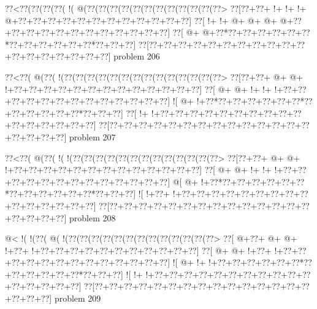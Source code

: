 \vbox{\vbox{\goo
\0??<\0??(\0??(\0??(\0??(\- !(\- @(\0??(\0??(\0??(\0??(\0??(\0??(\0??(\0??(\0??(\0??(\0??(\0??>
\0??[\0??+\0??+\- !+\- !+\- !+\- @+\0??+\0??+\0??+\0??+\0??+\0??+\0??+\0??+\0??+\0??+\0??+\0??]
\0??[\- !+\- !+\- @+\- @+\- @+\- @+\0??+\0??+\0??+\0??+\0??+\0??+\0??+\0??+\0??+\0??+\0??+\0??]
\0??[\- @+\- @+\0??*\0??+\0??+\0??+\0??+\0??+\0??*\0??+\0??+\0??+\0??+\0??+\0??*\0??+\0??+\0??]
\0??[\0??+\0??+\0??+\0??+\0??+\0??+\0??+\0??+\0??+\0??+\0??+\0??+\0??+\0??+\0??+\0??+\0??+\0??]
}
\hfil problem 206\hfil\break
}



\vbox{\vbox{\goo
\0??<\0??(\- @(\0??(\- !(\0??(\0??(\0??(\0??(\0??(\0??(\0??(\0??(\0??(\0??(\0??(\0??(\0??(\0??>
\0??[\0??+\0??+\- @+\- @+\- !+\0??+\0??+\0??+\0??+\0??+\0??+\0??+\0??+\0??+\0??+\0??+\0??+\0??]
\0??[\- @+\- @+\- !+\- !+\- !+\0??+\0??+\0??+\0??+\0??+\0??+\0??+\0??+\0??+\0??+\0??+\0??+\0??]
\- ![\- @+\- !+\0??*\0??+\0??+\0??+\0??+\0??+\0??*\0??+\0??+\0??+\0??+\0??+\0??*\0??+\0??+\0??]
\0??[\- !+\- !+\0??+\0??+\0??+\0??+\0??+\0??+\0??+\0??+\0??+\0??+\0??+\0??+\0??+\0??+\0??+\0??]
\0??[\0??+\0??+\0??+\0??+\0??+\0??+\0??+\0??+\0??+\0??+\0??+\0??+\0??+\0??+\0??+\0??+\0??+\0??]
}
\hfil problem 207\hfil\break
}



\vbox{\vbox{\goo
\0??<\0??(\- @(\0??(\- !(\- !(\0??(\0??(\0??(\0??(\0??(\0??(\0??(\0??(\0??(\0??(\0??(\0??(\0??>
\0??[\0??+\0??+\- @+\- @+\- !+\0??+\0??+\0??+\0??+\0??+\0??+\0??+\0??+\0??+\0??+\0??+\0??+\0??]
\0??[\- @+\- @+\- !+\- !+\- !+\0??+\0??+\0??+\0??+\0??+\0??+\0??+\0??+\0??+\0??+\0??+\0??+\0??]
\- @[\- @+\- !+\0??*\0??+\0??+\0??+\0??+\0??+\0??*\0??+\0??+\0??+\0??+\0??+\0??*\0??+\0??+\0??]
\- ![\- !+\0??+\- !+\0??+\0??+\0??+\0??+\0??+\0??+\0??+\0??+\0??+\0??+\0??+\0??+\0??+\0??+\0??]
\0??[\0??+\0??+\0??+\0??+\0??+\0??+\0??+\0??+\0??+\0??+\0??+\0??+\0??+\0??+\0??+\0??+\0??+\0??]
}
\hfil problem 208\hfil\break
}



\vbox{\vbox{\goo
\- @<\- !(\- !(\0??(\- @(\- !(\0??(\0??(\0??(\0??(\0??(\0??(\0??(\0??(\0??(\0??(\0??(\0??(\0??>
\0??[\- @+\0??+\- @+\- @+\- !+\0??+\- !+\0??+\0??+\0??+\0??+\0??+\0??+\0??+\0??+\0??+\0??+\0??]
\0??[\- @+\- @+\- !+\0??+\- !+\0??+\0??+\0??+\0??+\0??+\0??+\0??+\0??+\0??+\0??+\0??+\0??+\0??]
\- ![\- @+\- !+\- !+\0??+\0??+\0??+\0??+\0??+\0??*\0??+\0??+\0??+\0??+\0??+\0??*\0??+\0??+\0??]
\- ![\- !+\- !+\0??+\0??+\0??+\0??+\0??+\0??+\0??+\0??+\0??+\0??+\0??+\0??+\0??+\0??+\0??+\0??]
\0??[\0??+\0??+\0??+\0??+\0??+\0??+\0??+\0??+\0??+\0??+\0??+\0??+\0??+\0??+\0??+\0??+\0??+\0??]
}
\hfil problem 209\hfil\break
}



